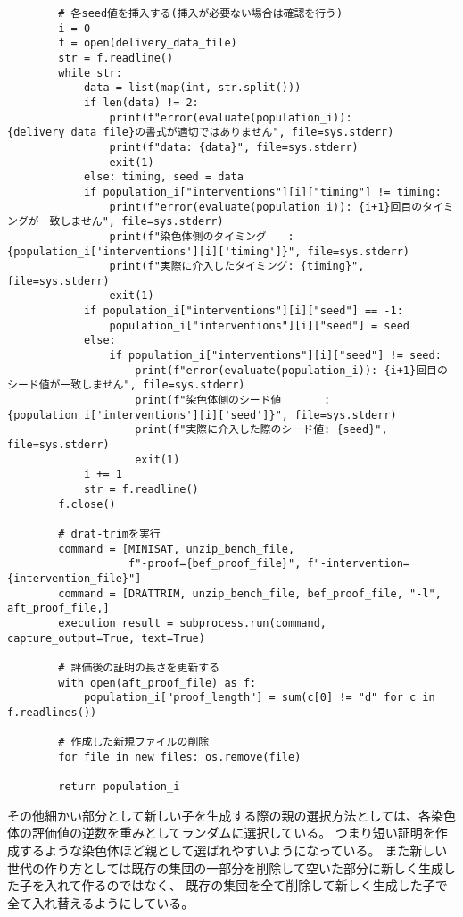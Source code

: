 \begin{lstlisting}
        # 各seed値を挿入する(挿入が必要ない場合は確認を行う)
        i = 0
        f = open(delivery_data_file)
        str = f.readline()
        while str:
            data = list(map(int, str.split()))
            if len(data) != 2:
                print(f"error(evaluate(population_i)): {delivery_data_file}の書式が適切ではありません", file=sys.stderr)
                print(f"data: {data}", file=sys.stderr)
                exit(1)
            else: timing, seed = data
            if population_i["interventions"][i]["timing"] != timing:
                print(f"error(evaluate(population_i)): {i+1}回目のタイミングが一致しません", file=sys.stderr)
                print(f"染色体側のタイミング　　: {population_i['interventions'][i]['timing']}", file=sys.stderr)
                print(f"実際に介入したタイミング: {timing}", file=sys.stderr)
                exit(1)
            if population_i["interventions"][i]["seed"] == -1:
                population_i["interventions"][i]["seed"] = seed
            else:
                if population_i["interventions"][i]["seed"] != seed:
                    print(f"error(evaluate(population_i)): {i+1}回目のシード値が一致しません", file=sys.stderr)
                    print(f"染色体側のシード値　　　　: {population_i['interventions'][i]['seed']}", file=sys.stderr)
                    print(f"実際に介入した際のシード値: {seed}", file=sys.stderr)
                    exit(1)
            i += 1
            str = f.readline()
        f.close()

        # drat-trimを実行
        command = [MINISAT, unzip_bench_file,
                   f"-proof={bef_proof_file}", f"-intervention={intervention_file}"]
        command = [DRATTRIM, unzip_bench_file, bef_proof_file, "-l", aft_proof_file,]
        execution_result = subprocess.run(command, capture_output=True, text=True)

        # 評価後の証明の長さを更新する
        with open(aft_proof_file) as f:
            population_i["proof_length"] = sum(c[0] != "d" for c in f.readlines())

        # 作成した新規ファイルの削除
        for file in new_files: os.remove(file)

        return population_i
\end{lstlisting}



その他細かい部分として新しい子を生成する際の親の選択方法としては、各染色体の評価値の逆数を重みとしてランダムに選択している。
つまり短い証明を作成するような染色体ほど親として選ばれやすいようになっている。
また新しい世代の作り方としては既存の集団の一部分を削除して空いた部分に新しく生成した子を入れて作るのではなく、
既存の集団を全て削除して新しく生成した子で全て入れ替えるようにしている。

